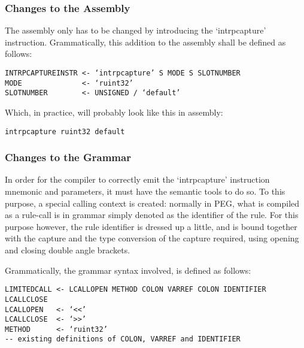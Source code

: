 \subsubsection{Changes to the Assembly}

The assembly only has to be changed by introducing the ‘intrpcapture’ 
instruction.
Grammatically, this addition to the assembly shall be defined as follows:

\begin{changemargin}{-60mm}{0mm}
\begin{myquote}
\begin{verbatim}
INTRPCAPTUREINSTR <- ‘intrpcapture’ S MODE S SLOTNUMBER
MODE              <- ‘ruint32’
SLOTNUMBER        <- UNSIGNED / ‘default’
\end{verbatim}
\end{myquote}
\end{changemargin}

Which, in practice, will probably look like this in assembly:

\begin{changemargin}{-60mm}{0mm}
\begin{myquote}
\begin{verbatim}
intrpcapture ruint32 default
\end{verbatim}
\end{myquote}
\end{changemargin}

\subsubsection{Changes to the Grammar}

In order for the compiler to correctly emit the ‘intrpcapture’ 
instruction mnemonic and parameters, it must have the semantic tools to do 
so. To this purpose, a special calling context is created: normally in 
PEG, what is compiled as a rule-call is in grammar simply denoted as the 
identifier of the rule. For this purpose however, the rule identifier is 
dressed up a little, and is bound together with the capture and the type 
conversion of the capture required, using opening and closing double angle 
brackets.

Grammatically, the grammar syntax involved, is defined as follows:

\begin{changemargin}{-60mm}{0mm}
\begin{myquote}
\begin{verbatim}
LIMITEDCALL <- LCALLOPEN METHOD COLON VARREF COLON IDENTIFIER LCALLCLOSE
LCALLOPEN   <- ‘<<’
LCALLCLOSE  <- ‘>>’
METHOD      <- ‘ruint32’
-- existing definitions of COLON, VARREF and IDENTIFIER
\end{verbatim}
\end{myquote}
\end{changemargin}

